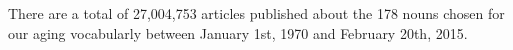 There are a total of 27,004,753 articles published about the
178 nouns chosen for our aging vocabularly between January 1st, 1970
and February 20th, 2015.
